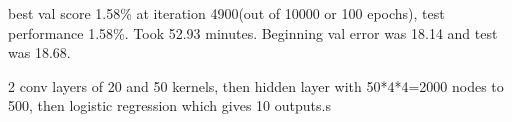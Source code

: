 
best val score 1.58\% at iteration 4900(out of 10000 or 100 epochs), test performance 1.58\%. Took 52.93 minutes.
Beginning val error was 18.14 and test was 18.68.

2 conv layers of 20 and 50 kernels, then hidden layer with 50*4*4=2000 nodes to 500, then logistic regression which gives 10 outputs.s